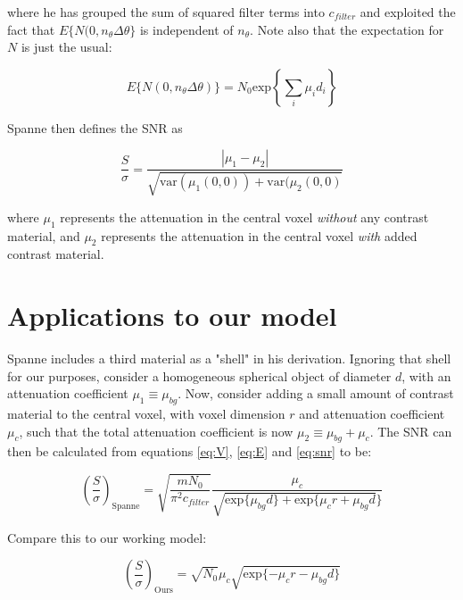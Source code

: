 \documentclass[11pt]{article}
\begin{document}
where he has grouped the sum of squared filter terms into \(c_{filter}\) and exploited the fact that $E\{N(0,n_{\theta}\Delta\theta\}$ is
independent of $n_{\theta}$. Note also that the expectation for \(N\) is just the usual:

\begin{equation}
        E\{N(0,n_{\theta}\Delta\theta)\} = N_0 \text{exp}\left\{\sum_i \mu_i d_i\right\} \label{eq:E}
\end{equation}  

Spanne then defines the SNR as


\begin{equation}
        \frac{S}{\sigma} = \frac{|\mu_1 - \mu_2|}{\sqrt{\text{var}(\mu_1(0,0)) + \text{var}(\mu_2(0,0)}} \label{eq:snr}
\end{equation}


where \(\mu_1\) represents the attenuation in the central voxel \textit{without} any contrast material, and \(\mu_2\) 
represents the attenuation in the central voxel \textit{with} added contrast material. 

\section{Applications to our model}
\label{sec:orgf0bee3c}

Spanne includes a third material as a "shell" in his derivation. Ignoring that shell for our purposes, 
consider a homogeneous spherical object of diameter \(d\), with an attenuation coefficient \(\mu_1 \equiv \mu_{bg}\). Now, consider 
adding a small amount of contrast material to the central voxel, with voxel dimension \(r\) and attenuation 
coefficient \(\mu_c\), such that the total attenuation coefficient is now \(\mu_2 \equiv \mu_{bg} + \mu_c\). The SNR can then be calculated 
from equations \ref{eq:V}, \ref{eq:E} and \ref{eq:snr} to be:


\begin{equation}
        \left(\frac{S}{\sigma}\right)_{\text{Spanne}} = \sqrt{\frac{mN_0}{\pi^2 c_{filter}}}\frac{\mu_c}{\sqrt{\text{exp}\{\mu_{bg} d \} + \text{exp}\{\mu_c r + \mu_{bg} d }\}}
\end{equation}


Compare this to our working model: 

\begin{equation}
        \left(\frac{S}{\sigma}\right)_{\text{Ours}} = \sqrt{N_0} \mu_c \sqrt{\text{exp}\{-\mu_c  r - \mu_{bg} d\}}
\end{equation}
\end{document}
